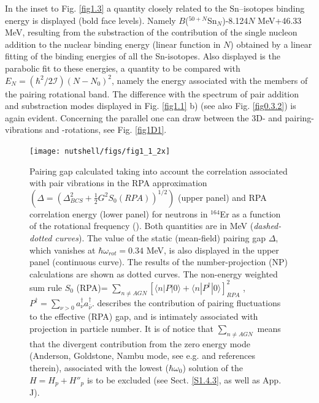   In the inset to Fig. \ref{fig1.3} a quantity closely related to the Sn--isotopes binding energy is displayed (bold face levels). Namely $B$($^{50+N}$Sn$_N$)-8.124$N$ MeV+46.33 MeV, resulting from the substraction of the contribution of the single nucleon addition to the nuclear binding energy (linear function in $N$)  obtained by a linear fitting of the binding energies of all the Sn-isotopes. 
  Also displayed is the parabolic fit to these energies, a quantity to be compared with $E_N=(\hbar^2/2\mathcal I)(N-N_0)^2$, namely the energy associated with the members of the pairing rotational band. The difference with the spectrum of pair addition and substraction modes displayed in Fig. \ref{fig1.1} b) (see also Fig. \ref{fig0.3.2}) is again evident.  Concerning the parallel one can draw between the 3D- and pairing-vibrations and -rotations, see Fig. \ref{fig1D1}.
  
  \begin{figure}[h!]
  \centerline{\texttt{[image: nutshell/figs/fig1\_1\_2x]}}
  \caption[Pairing gap as a function of $\hbar\omega_{rot}$.]{ Pairing gap calculated taking into account the correlation associated with pair vibrations in the RPA approximation $(\Delta=(\Delta^2_{BCS}+\tfrac{1}{2}G^2S_0(RPA))^{1/2})$ (upper panel) and RPA correlation energy (lower panel) for neutrons in $^{164}$Er as a function of the rotational frequency (\cite{Shimizu:89,Shimizu:13}). Both quantities are in MeV (\textit{dashed-dotted curves}). The value of the static (mean-field) pairing gap $\Delta$, which vanishes at $\hbar \omega_{rot}=0.34 $ MeV, is also displayed in the upper panel (continuous curve). The results of the number-projection (NP) calculations are shown as dotted curves.   The non-energy weighted sum rule 
$S_0$ (RPA)= $\sum_{n \neq AGN} \left[\langle n|P |0\rangle  + \langle n|P^{\dagger} |0\rangle \right]^2_{RPA}$ , $P^\dagger=\sum_{\nu> 0}a^\dagger_\nu a^\dagger_{\bar \nu}$.    describes the contribution of pairing fluctuations to the effective (RPA) gap,
    and is intimately associated with projection in particle number. It is of notice
    that $\sum_{n \neq AGN}$ means that the divergent contribution from the zero energy mode
    (Anderson, Goldstone, Nambu mode, see e.g. \cite{Broglia:00} and references therein), associated with the lowest ($\hbar \omega_0$) solution
    of the $H=H_{p}+H''_p$ is to be excluded (see Sect. \ref{S1.4.3},  as well as \cite{Brink:05} App. J).}\label{fig1.2}
  \end{figure}
  \FloatBarrier
